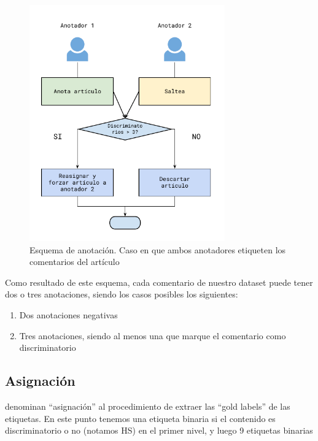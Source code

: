 \begin{figure}
    \centering
    \includegraphics[width=0.75\textwidth]{img/esquema_anotacion_caso_2.pdf}
    \caption{Esquema de anotación. Caso en que ambos anotadores etiqueten los comentarios del artículo}
    \label{fig:annotation_schema_case_two}
\end{figure}


Como resultado de este esquema, cada comentario de nuestro dataset puede tener dos o tres anotaciones, siendo los casos posibles los siguientes:

\begin{enumerate}
    \item Dos anotaciones negativas
    \item Tres anotaciones, siendo al menos una que marque el comentario como discriminatorio
\end{enumerate}




\subsection{Asignación}

\citet{pustejovsky2012natural} denominan ``asignación'' al procedimiento de extraer las ``gold labels'' de las etiquetas. En este punto tenemos una etiqueta binaria si el contenido es discriminatorio o no (notamos HS) en el primer nivel, y luego 9 etiquetas binarias

